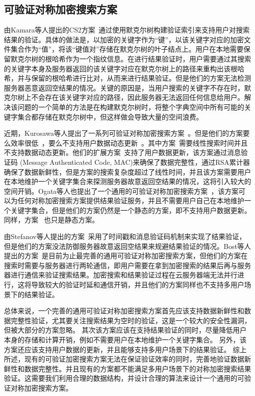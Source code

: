 \subsection{可验证对称加密搜索方案}
由Kamara等人提出的CS2方案~\cite{kamara2011cs2}通过使用默克尔树构建验证索引来支持用户对搜索结果的验证。具体的做法是，以加密的关键字作为“键”，以该关键字对应的加密文件集合作为“值”，将该“键值对”存储在默克尔树的叶子结点上。用户在本地需要保留默克尔树的根哈希作为一个指纹信息。在进行结果验证时，用户需要通过其搜索的关键字本身及服务器返回的该关键字对应在默克尔树上的路径来重构出该根哈希，并与保留的根哈希进行比对，从而来进行结果验证。但是他们的方案无法检测服务器恶意返回空结果的情况。关键的原因是，当用户搜索的关键字不存在时，默克尔树上不会存在该关键字对应的路径，因此服务器无法返回任何信息给用户。解决该问题的一个简单的方法是在构建默克尔树时，将整个字典空间中所有可能的关键字集合都存储在默克尔树中，但这样做会导致大量的空间浪费。

近期，Kurosawa等人提出了一系列可验证对称加密搜索方案~\cite{kurosawa2012uc,kurosawa2013update,ogataefficient}。但是他们的方案要么效率很低~\cite{kurosawa2012uc,kurosawa2013update}，要么不支持用户数据动态更新~\cite{kurosawa2012uc,ogataefficient}。其中方案~\cite{kurosawa2012uc}需要线性搜索时间并且不支持数据动态更新。他们的扩展方案~\cite{kurosawa2013update}支持了用户数据更新，该方案通过消息验证码 (Message Authenticated Code, MAC)来确保了数据完整性，通过RSA累计器确保了数据新鲜性，但是方案的搜索复杂度超过了线性时间，并且该方案需要用户在本地维护一个关键字集合来探测服务器故意返回空结果的情况，这将引入较大的空间开销。Ogata等人也提出了一个通用的可验证对称加密搜索方案~\cite{ogataefficient}，该方案可以为任何对称加密搜索方案提供结果验证服务，并且不需要用户自己在本地维护一个关键字集合，但是他们的方案仍然是一个静态的方案，即不支持用户数据更新。同样，方案~\cite{chai2012verifiable} \cite{cheng2015verifiable}也只是静态方案。

由Stefanov等人提出的方案~\cite{stefanov2014practical}采用了时间戳和消息验证码机制来实现了结果验证，但是他们的方案没法防御服务器故意返回空结果来规避结果验证的情况。Bost等人提出的方案~\cite{bost2016verifiable}是目前为止最完善的通用可验证对称加密搜索方案，但他们的方案在搜索时需要与服务器进行两轮通信，即用户需要在拿到加密搜索的结果后再与服务器进行通信来验证搜索结果。加密搜索和结果验证过程在云服务器端无法并行进行，这将导致较大的验证时延和通信开销，并且他们的方案同样也不支持多用户场景下的结果验证。

总体来说，一个完善的通用可验证对称加密搜索方案首先应该支持数据新鲜性和数据完整性验证，尤其要关注搜索结果为空时的验证，这是一个较大的安全性漏洞，但被大部分的方案忽略。
其次该方案应该在支持结果验证的同时，尽量降低用户本身的存储和计算开销，例如不需要用户在本地维护一个关键字集合。
另外，该方案还应该支持用户数据的更新，并且能够支持多用户场景下的结果验证。
综上所述，现有的可验证加密搜索方案无法在保证验证效率的同时，完善地验证数据新鲜性和数据完整性。并且现有的方案都不能满足多用户场景下的对称加密搜索结果验证。这需要我们利用合理的数据结构，并设计合理的算法来设计一个通用的可验证对称加密搜索方案。

